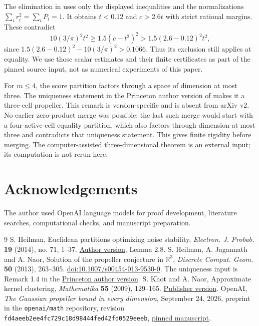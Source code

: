 \documentclass[11pt,reqno]{amsart}
\numberwithin{equation}{section}
\theoremstyle{definition}
\theoremstyle{remark}
\newcommand{\R}{\mathbb R}
\begin{document}
The elimination in \cite[Section 5 and Appendix A]{OpenAI} uses
only the displayed inequalities and the normalizations
$\sum_i r_i^2=\sum_iP_i=1$. It obtains $t<0.12$ and $c>2.6t$
with strict rational margins. These contradict
\[
 10(3/\pi)^2t^2\ge1.5(c-t^2)^2
       >1.5(2.6-0.12)^2t^2,
\]
since $1.5(2.6-0.12)^2-10(3/\pi)^2>0.1066$.
Thus its exclusion still applies at equality. We use those scalar
estimates and their finite certificates as part of the pinned source
input, not as numerical experiments of this paper.

For $m\le4$, the score partition factors through a space of dimension
at most three. The uniqueness statement in the Princeton author
version of \cite[Remark 1.4]{HJN} makes it a three-cell propeller.
This remark is version-specific and is absent from arXiv v2.
No earlier zero-product merge was possible: the last such merge
would start with a four-active-cell equality partition, which also
factors through dimension at most three and contradicts that
uniqueness statement. This gives finite rigidity before merging.
The computer-assisted three-dimensional theorem is an external
input; its computation is not rerun here.

\section*{Acknowledgements}
The author used OpenAI language models for proof development, literature
searches, computational checks, and manuscript preparation.

\begin{thebibliography}{9}
 S. Heilman, Euclidean partitions optimizing noise
stability, \emph{Electron. J. Probab.} \textbf{19} (2014), no. 71,
1--37. \href{https://www.stevenheilman.org/~heilman/papers/SSC.pdf}{Author version},
Lemma 2.8.
 S. Heilman, A. Jagannath and A. Naor,
Solution of the propeller conjecture in $\R^3$,
\emph{Discrete Comput. Geom.} \textbf{50} (2013), 263--305.
\href{https://doi.org/10.1007/s00454-013-9530-0}{doi:10.1007/s00454-013-9530-0}.
The uniqueness input is Remark 1.4 in the
\href{https://web.math.princeton.edu/~naor/homepage%20files/PropR3.pdf}{Princeton author version}.
 S. Khot and A. Naor, Approximate kernel clustering,
\emph{Mathematika} \textbf{55} (2009), 129--165.
\href{https://doi.org/10.1112/S002557930000098X}{Publisher version}.
 OpenAI, \emph{The Gaussian propeller bound in every
dimension}, September 24, 2026, preprint in the \texttt{openai/math}
repository, revision
\texttt{fd4aeeb2ee4fc729c18d98444fed42fd0529eeeb},
\href{https://github.com/openai/math/tree/fd4aeeb2ee4fc729c18d98444fed42fd0529eeeb/preprints/The-Gaussian-Propeller-Bound-in-Every-Dimension-September-24-2026}{pinned manuscript}.
\end{thebibliography}
\end{document}
